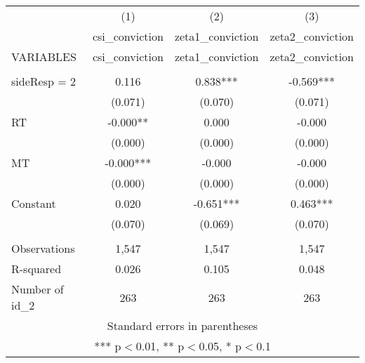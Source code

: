 \documentclass[]{article}
\begin{document}
\begin{tabular}{lccc} \hline
 & (1) & (2) & (3) \\
 & csi\_conviction & zeta1\_conviction & zeta2\_conviction \\
VARIABLES & csi\_conviction & zeta1\_conviction & zeta2\_conviction \\ \hline
 &  &  &  \\
sideResp = 2 & 0.116 & 0.838*** & -0.569*** \\
 & (0.071) & (0.070) & (0.071) \\
RT & -0.000** & 0.000 & -0.000 \\
 & (0.000) & (0.000) & (0.000) \\
MT & -0.000*** & -0.000 & -0.000 \\
 & (0.000) & (0.000) & (0.000) \\
Constant & 0.020 & -0.651*** & 0.463*** \\
 & (0.070) & (0.069) & (0.070) \\
 &  &  &  \\
Observations & 1,547 & 1,547 & 1,547 \\
R-squared & 0.026 & 0.105 & 0.048 \\
 Number of id\_2 & 263 & 263 & 263 \\ \hline
\multicolumn{4}{c}{ Standard errors in parentheses} \\
\multicolumn{4}{c}{ *** p$<$0.01, ** p$<$0.05, * p$<$0.1} \\
\end{tabular}
\end{document}
